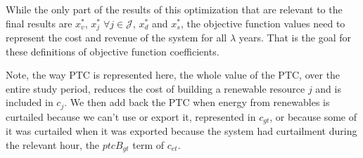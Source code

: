 \documentclass[9pt, oneside]{article}
\numberwithin{equation}{subsubsection}
\begin{document}
While the only part of the results of this optimization that are relevant to the final results are $x_v^*$, $x_j^* \;\forall j \in \mathcal{J}$, $x_d^*$ and $x_s^*$, the objective function values need to represent the cost and revenue of the system for all $\lambda$ years.
That is the goal for these definitions of objective function coefficients.

Note, the way PTC is represented here, the whole value of the PTC, over
the entire study period, reduces the cost of building a renewable
resource $j$ and is included in $c_j$.
We then add back the PTC when energy from renewables
is curtailed because we can’t use or export it, represented in $c_{gt}$, or
because some of it was curtailed when it was exported because the system
had curtailment during the relevant hour, the $ptcB_{gt}$ term of $c_{et}$.
\end{document}
